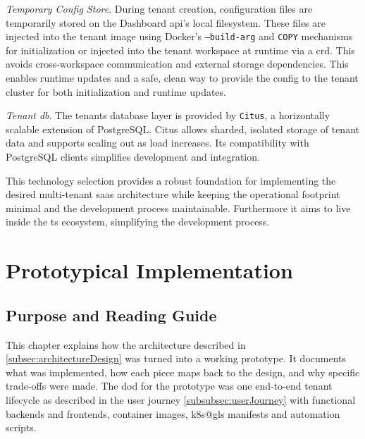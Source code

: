 \documentclass[11pt, a4paper, oneside, listof=totoc]{scrartcl}
\begin{document}
\begin{enumerate}[label={[\arabic*]:},
                ref=Challenge~\arabic*,
                leftmargin=*,
                itemsep=0.6\baselineskip]
                \item\label{chal:tempConfigStore}
                    \textit{Temporary Config Store}.
                    During tenant creation, configuration files are temporarily stored on the
                    Dashboard \gls{api}'s local filesystem.
                    These files are injected into the tenant image using Docker's
                    \texttt{--build-arg} and \texttt{COPY} mechanisms for initialization or
                    injected into the tenant workspace at runtime via a \gls{crd}.
                    This avoids cross-workspace communication and external storage dependencies.
                    This enables runtime updates and a safe, clean way to provide the config to the
                    tenant cluster for both initialization and runtime updates.

                \item\label{chal:tenantDB2}
                    \textit{Tenant \gls{db}}.
                    The tenants database layer is provided by \texttt{Citus}, a horizontally
                    scalable extension of PostgreSQL.\@
                    Citus allows sharded, isolated storage of tenant data and supports scaling out
                    as load increases.
                    Its compatibility with PostgreSQL clients simplifies development and
                    integration.

            \end{enumerate}

            This technology selection provides a robust foundation for implementing the desired
            multi-tenant \gls{saas} architecture while keeping the operational footprint minimal and
            the development process maintainable.
            Furthermore it aims to live inside the \gls{ts} ecosystem, simplifying the development
            process.

    \clearpage

    \section{Prototypical Implementation}\label{sec:prototype}

        \subsection{Purpose and Reading Guide}\label{subsec:purposeAndReadingGuide}
            This chapter explains how the architecture described in
            \autoref{subsec:architectureDesign} was turned into a working prototype.
            It documents what was implemented, how each piece maps back to the design, and why
            specific trade-offs were made.
            The \gls{dod} for the prototype was one end-to-end tenant lifecycle as described in
            the user journey \autoref{subsubsec:userJourney} with functional backends and frontends,
            container images, \gls{k8s@gls} manifests and automation scripts.
\end{document}

